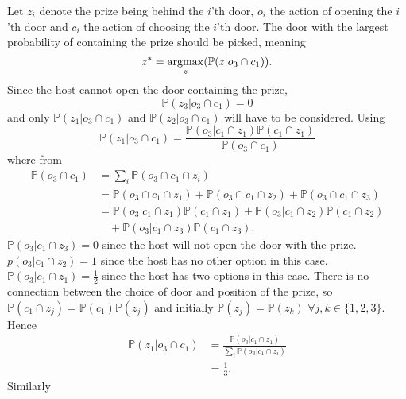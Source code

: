 \begin{example}
	Let $z_i$ denote the prize being behind the $i$'th door, $o_i$ the action of opening the $i$'th door and $c_i$ the action of choosing the $i$'th door. The door with the largest probability of containing the prize should be picked, meaning
	\begin{equation}
		z^*=\operatorname*{argmax}_z(\mathbb{P}(z|o_3 \cap c_1)).
	\end{equation}
	Since the host cannot open the door containing the prize, 
	\begin{equation}
		\mathbb{P}(z_3|o_3 \cap c_1)=0
	\end{equation}
	 and only $\mathbb{P}(z_1|o_3 \cap c_1)$ and $\mathbb{P}(z_2|o_3 \cap c_1)$ will have to be considered. Using 
	\begin{equation}
		\mathbb{P}(z_1|o_3 \cap c_1) = \frac{\mathbb{P}(o_3|c_1 \cap z_1)\mathbb{P}(c_1 \cap z_1)}{\mathbb{P}(o_3 \cap c_1)}
	\end{equation}
	where from 
	\begin{equation}
		\begin{split}
			\mathbb{P}(o_3 \cap c_1)&=\sum_i\mathbb{P}(o_3 \cap c_1 \cap z_i)\\
			&=\mathbb{P}(o_3 \cap c_1 \cap z_1)+\mathbb{P}(o_3 \cap c_1 \cap z_2)+\mathbb{P}(o_3 \cap c_1 \cap z_3)\\
			&= \mathbb{P}(o_3|c_1 \cap z_1)\mathbb{P}(c_1 \cap z_1)+\mathbb{P}(o_3|c_1 \cap z_2)\mathbb{P}(c_1 \cap z_2)\\
			&\quad+\mathbb{P}(o_3|c_1 \cap z_3)\mathbb{P}(c_1 \cap z_3).
		\end{split}
	\end{equation}
	$\mathbb{P}(o_3|c_1 \cap z_3)=0$ since the host will not open the door with the prize. $p(o_3|c_1 \cap z_2)=1$ since the host has no other option in this case. $\mathbb{P}(o_3|c_1 \cap z_1)=\frac{1}{2}$ since the host has two options in this case. There is no connection between the choice of door and position of the prize, so $\mathbb{P}(c_1 \cap z_j)=\mathbb{P}(c_1)\mathbb{P}(z_j)$ and initially $\mathbb{P}(z_j)=\mathbb{P}(z_k)$ $\forall j,k\in \{1,2,3\}$. Hence
	\begin{equation}
		\begin{split}
			\mathbb{P}(z_1|o_3 \cap c_1) &= \frac{\mathbb{P}(o_3|c_1 \cap z_1)}{\sum_i\mathbb{P}(o_3|c_1 \cap z_i)}\\
			&=\frac{1}{3}.
		\end{split}
	\end{equation}
	Similarly

\end{example}
